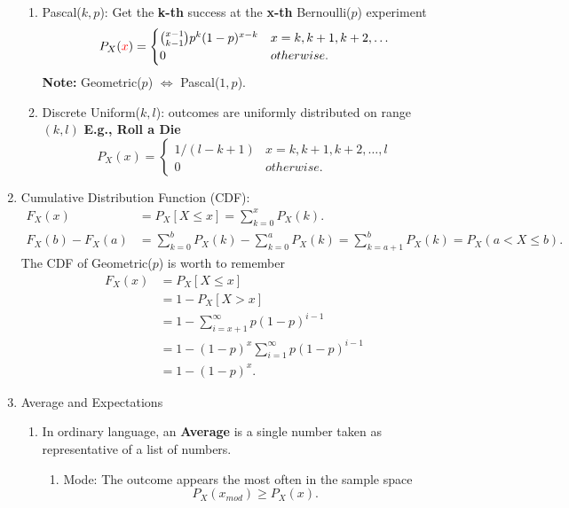 \begin{enumerate}
{\begin{enumerate}
{            }
            \item Pascal($k,p$): Get the \textbf{k-th} success at the \textbf{x-th} Bernoulli($p$) experiment {
                \[P_X(\textcolor{red}{x}) = {
                    \begin{cases}
                        \binom{x-1}{k-1}p^k(1-p)^{x-k} & x=k,k+1,k+2,\ldots \\
                        0 & otherwise.
                    \end{cases}
                }\]
                \textbf{Note:} Geometric($p$) $\iff$ Pascal($1, p$).
            }
            \item Discrete Uniform($k, l$): outcomes are uniformly distributed on range $(k, l)$ \textbf{E.g., Roll a Die}{
                \[ P_X(x) = 
                \begin{cases}
                    1/(l-k+1)   & x=k,k+1,k+2,\ldots,l \\
                    0   & otherwise.
                \end{cases} \]
            }            
        \end{enumerate}
    }
    \item Cumulative Distribution Function (CDF): {
        \begin{align*}
            F_X(x)&=P_X[X\leq x]=\sum_{k=0}^{x}P_X(k). \\
            F_X(b)-F_X(a)&=\sum_{k=0}^{b}P_X(k)-\sum_{k=0}^{a}P_X(k)=\sum_{k=a+1}^{b}P_X(k)=P_X(a<X\leq b).
        \end{align*}
        The CDF of Geometric($p$) is worth to remember
        \begin{align*}
            F_X(x)
            &= P_X[X\leq x] \\
            &= 1-P_X[X > x] \\
            &= 1-\sum_{i=x+1}^{\infty}p(1-p)^{i-1} \\
            &= 1-(1-p)^x\sum_{i=1}^{\infty}p(1-p)^{i-1} \\
            &= 1-(1-p)^x.
        \end{align*}
    }
    \item Average and Expectations{
        \begin{enumerate}
            \item In ordinary language, an \textbf{Average} is a single number taken as representative of a list of numbers.{
            \begin{enumerate}
                \item Mode: The outcome appears the most often in the sample space \[P_X(x_{mod})\geq P_X(x).\]

\end{enumerate}}
\end{enumerate}}
\end{enumerate}
